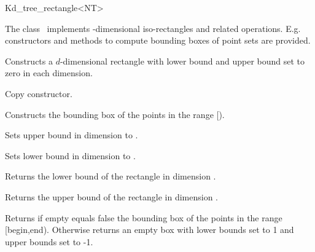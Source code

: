 

\begin{ccRefClass}{Kd_tree_rectangle<NT>}  %


\ccDefinition
  
The class \ccRefName\ implements -dimensional iso-rectangles and related operations.
E.g. constructors and methods to compute bounding boxes of point sets are provided. 



\ccCreation
{}  %



{Constructs a $d$-dimensional rectangle  with lower bound and upper bound set to zero 
in each dimension.}

{Copy constructor.}
 
{Constructs the bounding box of the points in the range [).}



{Sets upper bound in dimension  to .}

{Sets lower bound in dimension  to .}

{Returns the lower bound of the rectangle in dimension .}

{Returns the upper bound of the rectangle in dimension .}
 
{Returns if empty equals false the bounding box of the points in the range [begin,end). 
Otherwise returns an empty box with lower bounds set to 1 and upper bounds set to -1.}


\end{ccRefClass}
